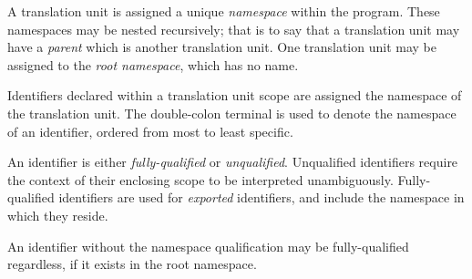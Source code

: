 \specsubitem
A translation unit is assigned a unique \textit{namespace} within the program.
These namespaces may be nested recursively; that is to say that a translation
unit may have a \textit{parent} which is another translation unit. One
translation unit may be assigned to the \textit{root namespace}, which has no
name.

\specsubitem
Identifiers declared within a translation unit scope are assigned the namespace
of the translation unit. The double-colon terminal \terminal{::} is used to
denote the namespace of an identifier, ordered from most to least specific.

\specsubitem
An identifier is either \textit{fully-qualified} or \textit{unqualified}.
Unqualified identifiers require the context of their enclosing scope to be
interpreted unambiguously. Fully-qualified identifiers are used for
\textit{exported} identifiers, and include the namespace in which they reside.


\specsubitem
An identifier without the namespace qualification may be fully-qualified
regardless, if it exists in the root namespace.
